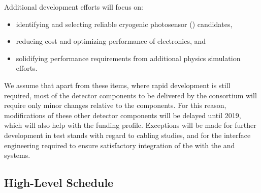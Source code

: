 
Additional development efforts will focus on:

\begin{itemize}
\item identifying and selecting reliable cryogenic photosensor () candidates,
\item reducing cost and optimizing performance of  electronics, and 
\item solidifying  performance requirements from additional physics simulation efforts.
\end{itemize}

We assume that apart from these items, where rapid development is still required, most of the detector components to be delivered by the  consortium will require only minor changes relative to the  components. For this reason, modifications of these other detector components will be delayed until 2019, which will also help with the funding profile. Exceptions will be made for further development in test stands with regard to cabling studies, and for the interface engineering required to ensure satisfactory integration of the  with the  and   systems.


\subsection{High-Level Schedule}
\label{sec:fdsp-pd-org-cs}


